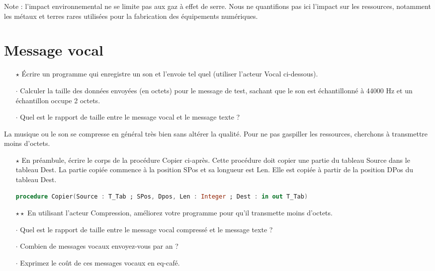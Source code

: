 \documentclass[a4paper]{article}
\begin{document}
\medskip

Note : l'impact environnemental ne se limite pas aux gaz à effet de serre. Nous ne quantifions pas ici l'impact sur les ressources, notamment les métaux et terres rares
utilisées pour la fabrication des équipements numériques.


\section{Message vocal}

\begin{itemize}
\item[$\star$] Écrire un programme qui enregistre un son et l'envoie tel quel (utiliser l'acteur Vocal ci-dessous).
\item[$\cdot$] Calculer la taille des données envoyées (en octets) pour le message de test, sachant que le son est échantillonné à 44000 Hz et un échantillon occupe 2 octets.
\item[$\cdot$] Quel est le rapport de taille entre le message vocal et le message texte ?
\end{itemize}



La musique ou le son se compresse en général très bien sans altérer la qualité.
Pour ne pas gaspiller les ressources, cherchons à transmettre moins d'octets.

\begin{itemize}
\item[$\star$] En préambule, écrire le corps de la procédure Copier ci-après. Cette procédure doit copier une partie du tableau Source dans le tableau Dest.
  La partie copiée commence à la position SPos et sa longueur est Len. Elle est copiée à partir de la position DPos du tableau Dest.

  \begin{lstlisting}[language=Ada]
    procedure Copier(Source : T_Tab ; SPos, Dpos, Len : Integer ; Dest : in out T_Tab) 
  \end{lstlisting}
  
  \item[$\star\star$] En utilisant l'acteur Compression, améliorez votre programme pour qu'il transmette moins d'octets.
\end{itemize}

\begin{itemize}
\item[$\cdot$] Quel est le rapport de taille entre le message vocal compressé et le message texte ?
\item[$\cdot$] Combien de messages vocaux envoyez-vous par an ?
\item[$\cdot$] Exprimez le coût de ces messages vocaux en eq-café.
\end{itemize}
\end{document}
